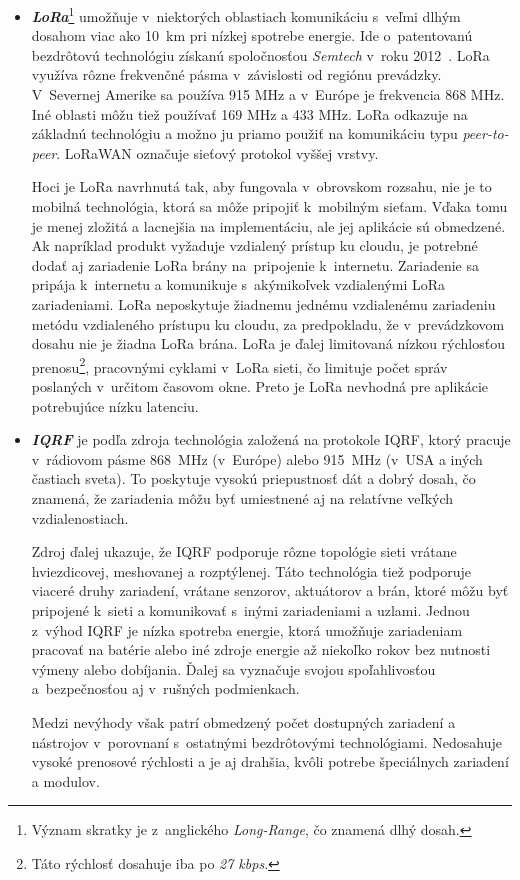 \begin{itemize}
    \item \textit{\textbf{LoRa}}\footnote{Význam skratky je z~anglického \emph{Long-Range}, čo znamená dlhý dosah.} umožňuje v~niektorých oblastiach komunikáciu s~veľmi dlhým dosahom viac ako 10~km pri nízkej spotrebe energie. 
    Ide o~patentovanú bezdrôtovú technológiu získanú spoločnosťou \emph{Semtech} v~roku 2012~\cite{slats_2021}.
    LoRa využíva rôzne frekvenčné pásma v~závislosti od regiónu prevádzky. 
    V~Severnej Amerike sa používa 915 MHz a v~Európe je frekvencia 868 MHz. 
    Iné oblasti môžu tiež používať 169 MHz a 433 MHz. 
    LoRa odkazuje na základnú technológiu a možno ju priamo použiť na komunikáciu typu \textit{peer-to-peer}. 
    LoRaWAN označuje sieťový protokol vyššej vrstvy.~\cite{elkhodr2016emerging}

    Hoci je LoRa navrhnutá tak, aby fungovala v~obrovskom rozsahu, nie je to mobilná technológia, ktorá sa môže pripojiť k~mobilným sieťam. 
    Vďaka tomu je menej zložitá a lacnejšia na implementáciu, ale jej aplikácie sú obmedzené. 
    Ak napríklad produkt vyžaduje vzdialený prístup ku cloudu, je potrebné dodať aj zariadenie LoRa brány na~pripojenie k~internetu. 
    Zariadenie sa pripája k~internetu a komunikuje s~akýmikoľvek vzdialenými LoRa zariadeniami. 
    LoRa neposkytuje žiadnemu jednému vzdialenému zariadeniu metódu vzdialeného prístupu ku cloudu, za predpokladu, že v~prevádzkovom dosahu nie je žiadna LoRa brána. 
    LoRa je ďalej limitovaná nízkou rýchlosťou prenosu\footnote{Táto rýchlosť dosahuje iba po \emph{27 kbps}.}, pracovnými cyklami v~LoRa sieti, čo limituje počet správ poslaných v~určitom časovom okne.
    Preto je LoRa nevhodná pre aplikácie potrebujúce nízku latenciu.~\cite{8474715}

    \item \textit{\textbf{IQRF}} je podľa zdroja \cite{IQRF} technológia založená na protokole IQRF, ktorý pracuje v~rádiovom pásme 868~MHz (v~Európe) alebo 915~MHz (v~USA a iných častiach sveta). To poskytuje vysokú priepustnosť dát a dobrý dosah, čo znamená, že zariadenia môžu byť umiestnené aj na relatívne veľkých vzdialenostiach.

    Zdroj \cite{IQRF} ďalej ukazuje, že IQRF podporuje rôzne topológie sieti vrátane hviezdicovej, meshovanej a rozptýlenej. Táto technológia tiež podporuje viaceré druhy zariadení, vrátane senzorov, aktuátorov a brán, ktoré môžu byť pripojené k~sieti a komunikovať s~inými zariadeniami a uzlami.
    Jednou z~výhod IQRF je nízka spotreba energie, ktorá umožňuje zariadeniam pracovať na batérie alebo iné zdroje energie až niekoľko rokov bez nutnosti výmeny alebo dobíjania. Ďalej sa vyznačuje svojou spoľahlivosťou a~bezpečnosťou aj v~rušných podmienkach.

    Medzi nevýhody však patrí obmedzený počet dostupných zariadení a nástrojov v~porovnaní s~ostatnými bezdrôtovými technológiami. Nedosahuje vysoké prenosové rýchlosti a je aj drahšia, kvôli potrebe špeciálnych zariadení a modulov.
\end{itemize}

